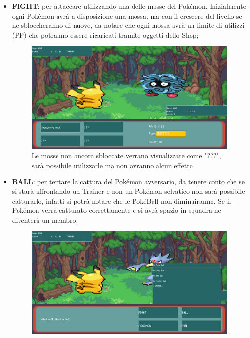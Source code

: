 \documentclass[a4paper,12pt]{report}
\begin{document}
{{\begin{itemize}
  \item \textbf{FIGHT}: per attaccare utilizzando una delle mosse del Pokémon. Inizialmente ogni Pokémon avrà a disposizione una mossa, ma con il crescere del livello se ne sbloccheranno di nuove, da notare che ogni mossa avrà un limite di utilizzi (PP) che potranno essere ricaricati tramite oggetti dello Shop;
\begin{figure}[H]
  \centering
    \includegraphics[width=\textwidth]{immagini/moveImg.png}
    \caption{Le mosse non ancora sbloccate verrano visualizzate come "???", sarà possibile utilizzarle ma non avranno alcun effetto}
    \label{fig:combat_phase}
\end{figure}
  \item \textbf{BALL}: per tentare la cattura del Pokémon avversario, da tenere conto che se si starà affrontando un Trainer e non un Pokémon selvatico non sarà possibile catturarlo, infatti si potrà notare che le PokéBall non diminuiranno. Se il Pokémon verrà catturato correttamente e si avrà spazio in squadra ne diventerà un membro.
  \begin{figure}[H]
  \centering
    \includegraphics[width=\textwidth]{immagini/ballImg.png}

\end{figure}
\end{itemize}}}
\end{document}
